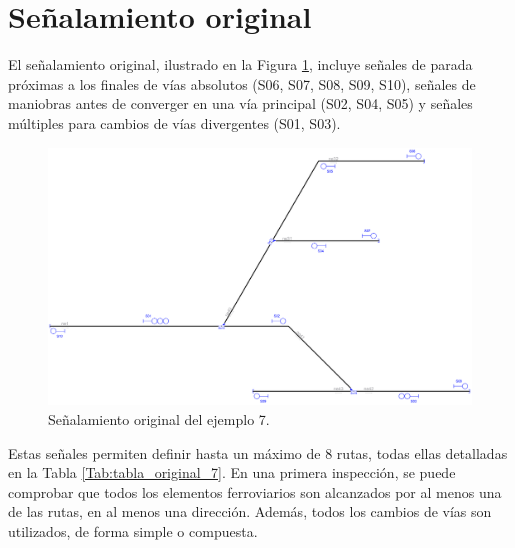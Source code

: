 \section{Señalamiento original}

    El señalamiento original, ilustrado en la Figura \ref{fig:EJ7_2}, incluye señales de parada próximas a los finales de vías absolutos (S06, S07, S08, S09, S10), señales de maniobras antes de converger en una vía principal (S02, S04, S05) y señales múltiples para cambios de vías divergentes (S01, S03).
    
    \begin{figure}[H]
    	\centering
    	\includegraphics[width=1\textwidth]{resultados-obtenidos/ejemplo7/images/7_original.png}
    	\centering\caption{Señalamiento original del ejemplo 7.}
    	\label{fig:EJ7_2}
    \end{figure}
    
    Estas señales permiten definir hasta un máximo de 8 rutas, todas ellas detalladas en la Tabla \ref{Tab:tabla_original_7}. En una primera inspección, se puede comprobar que todos los elementos ferroviarios son alcanzados por al menos una de las rutas, en al menos una dirección. Además, todos los cambios de vías son utilizados, de forma simple o compuesta. 
    
